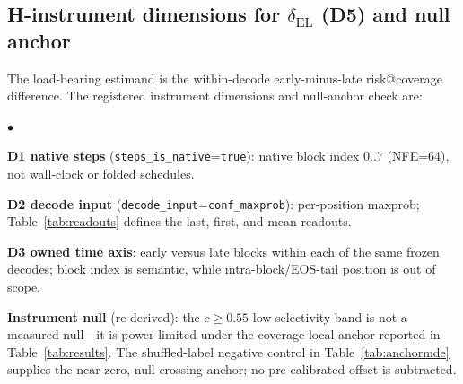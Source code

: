 \documentclass{article}
\begin{document}
\subsection{H-instrument dimensions for $\delta_{\mathrm{EL}}$ (D5) and null anchor}
\label{app:h7_d5_null}

The load-bearing estimand is the within-decode early-minus-late risk@coverage difference.
The registered instrument dimensions and null-anchor check are:

{\small
\begin{list}{$\bullet$}{
  \setlength{\leftmargin}{1.5em}
  \setlength{\labelwidth}{1em}
  \setlength{\labelsep}{0.5em}
  \setlength{\itemsep}{1pt}
  \setlength{\parsep}{0pt}
  \setlength{\topsep}{2pt}}
  \item \textbf{D1 native steps} (\texttt{steps\_is\_native}=\texttt{true}): native block
  index $0..7$ (NFE=64), not wall-clock or folded schedules.
  \item \textbf{D2 decode input} (\texttt{decode\_input}=\texttt{conf\_maxprob}): per-position
  maxprob; Table~\ref{tab:readouts} defines the last, first, and mean readouts.
  \item \textbf{D3 owned time axis}: early versus late blocks within each of the same frozen
  decodes; block index is semantic, while intra-block/EOS-tail position is out of scope.
  \item \textbf{Instrument null} (re-derived): the $c\ge0.55$ low-selectivity band is not a
  measured null---it is power-limited under the coverage-local anchor reported in
  Table~\ref{tab:results}. The shuffled-label negative control in Table~\ref{tab:anchormde}
  supplies the near-zero, null-crossing anchor; no pre-calibrated offset is subtracted.
\end{list}
}
\end{document}
